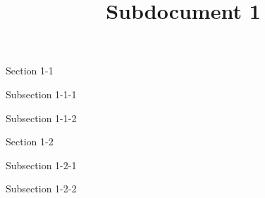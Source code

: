 \documentclass{article}
\title{Subdocument 1}
\date{}
\begin{document}
    \maketitle
    \tableofcontents

    \begin{section}{Section 1-1}
        \begin{subsection}{Subsection 1-1-1}
        \end{subsection}
        \begin{subsection}{Subsection 1-1-2}
        \end{subsection}
    \end{section}
    
    \begin{section}{Section 1-2}
        \begin{subsection}{Subsection 1-2-1}
        \end{subsection}
        \begin{subsection}{Subsection 1-2-2}
        \end{subsection}
    \end{section}
\end{document}
